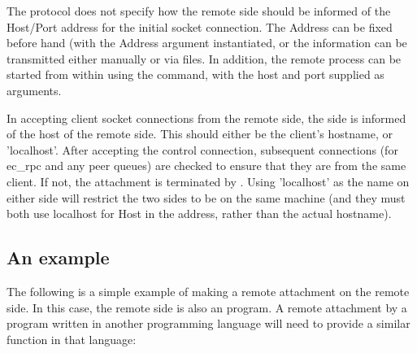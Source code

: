 The protocol does not specify how the remote side should be informed of the
Host/Port address for the initial socket connection. The Address can be
fixed before hand (with the Address argument instantiated, or
the information can be transmitted either manually or via files. In
addition, the remote process can be started from within {\eclipse} using
the  command, with the host and port supplied as arguments.

In accepting client socket connections from the remote side, the {\eclipse}
side is informed of the host of the remote side. This should either be the
client's hostname, or 'localhost'. After accepting the control connection,
subsequent connections (for ec_rpc and any peer queues) are checked to
ensure that they are from the same client. If not, the attachment is
terminated by {\eclipse}. Using 'localhost' as the name on either side will
restrict the two sides to be on the same machine (and they must both use
localhost for Host in the address, rather than the actual hostname). 

\subsection{An example}

The following is a simple example of making a remote attachment on the
remote side. In this case, the remote side is also an {\eclipse} program.
A remote attachment by a program written in another programming language
will need to provide a similar function in that language:

